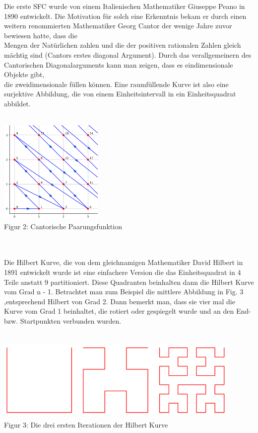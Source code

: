 \documentclass[course=erap]{aspdoc}
\begin{document}
Die erste SFC wurde von einem Italienischen Mathematiker Giuseppe Peano in 1890 entwickelt. 
\newpage
Die Motivation für solch eine Erkenntnis bekam er durch einen weitern  renommierten Mathematiker Georg Cantor der wenige Jahre zuvor bewiesen hatte, dass die \\ Mengen der Natürlichen zahlen und die der positiven rationalen Zahlen gleich mächtig sind (Cantors erstes diagonal Argument). 
Durch das verallgemeinern des Cantorischen Diagonalarguments kann man zeigen, dass es eindimensionale Objekte gibt, \\ die zweidimensionale füllen können. Eine raumfüllende Kurve ist also eine surjektive Abbildung, die von einem Einheitsintervall in ein Einheitsquadrat abbildet.
\\
\\
\begin{center}
	\includegraphics[width=5cm, height=5cm]{Cantor}\\	%
	\tiny Figur 2: Cantorische Paarungsfunktion
\end{center}
\	\\
\\
Die Hilbert Kurve, die von dem gleichnamigen Mathematiker David Hilbert in 1891 entwickelt wurde ist eine einfachere Version die das Einheitsquadrat in 4 Teile anstatt 9 partitioniert. Diese Quadranten beinhalten dann die Hilbert Kurve vom Grad n - 1. Betrachtet man zum Beispiel die mittlere Abbildung in Fig. 3 ,entsprechend Hilbert von Grad 2. Dann bemerkt man, dass sie vier mal die Kurve vom Grad 1 beinhaltet, die rotiert oder gespiegelt wurde und an den End- bzw. Startpunkten verbunden wurden.
\\
\\
\begin{center}
	\includegraphics[width=12cm, height=4cm]{Hilbert}\\	%
	\tiny Figur 3: Die drei ersten Iterationen der Hilbert Kurve
\end{center}
\end{document}

